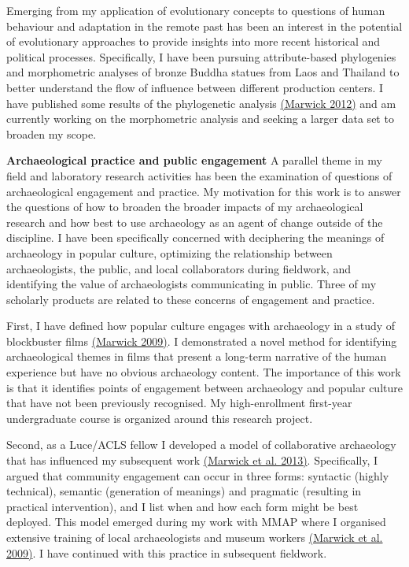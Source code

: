 \documentclass[11pt,article,oneside]{memoir}
\begin{document}
Emerging from my application of evolutionary concepts to questions of human behaviour and adaptation in the remote past has been an interest in the potential of evolutionary approaches to provide insights into more recent historical and political processes.  Specifically, I have been pursuing attribute-based phylogenies and morphometric analyses of bronze Buddha statues from Laos and Thailand to better understand the flow of influence between different production centers. I have published some results of the phylogenetic analysis \href{http://faculty.washington.edu/bmarwick/PDFs/Marwick_2012_Buddha_cladistics.pdf}{(Marwick 2012)} and am currently working on the morphometric analysis and seeking a larger data set to broaden my scope. 

\textbf{Archaeological practice and public engagement} A parallel theme in my field and laboratory research activities has been the examination of questions of archaeological engagement and practice. My motivation for this work is to answer the questions of how to broaden the broader impacts of my archaeological research and how best to use archaeology as an agent of change outside of the discipline. I have been specifically concerned with deciphering the meanings of archaeology in popular culture, optimizing the relationship between archaeologists, the public, and local collaborators during fieldwork, and identifying the value of archaeologists communicating in public. Three of my scholarly products are related to these concerns of engagement and practice. 

First, I have defined how popular culture engages with archaeology in a study of blockbuster films  \href{http://faculty.washington.edu/bmarwick/PDFs/Marwick_2010_WA_Wall-E.pdf}{(Marwick 2009)}. I demonstrated a novel method for identifying archaeological themes in films that present a long-term narrative of the human experience but have no obvious archaeology content. The importance of this work is that it identifies points of engagement between archaeology and popular culture that have not been previously recognised. My high-enrollment first-year undergraduate course is organized around this research project. 

Second, as a Luce/ACLS fellow I developed a model of collaborative archaeology that has influenced my subsequent work {\href{http://faculty.washington.edu/bmarwick/PDFs/Marwick_et_al_2013_community.pdf}{(Marwick et al. 2013)}}. Specifically, I argued that community engagement can occur in three forms: syntactic (highly technical), semantic (generation of meanings) and pragmatic (resulting in practical intervention), and I list when and how each form might be best deployed. This model emerged during my work with MMAP where I organised extensive training of local archaeologists and museum workers {\href{http://faculty.washington.edu/bmarwick/PDFs/Marwick_et_al_2009_MMAP.pdf}{(Marwick et al. 2009)}}. I have continued with this practice in subsequent fieldwork. 
\end{document}
